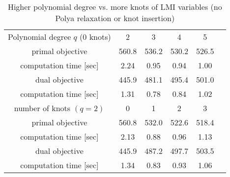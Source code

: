 \documentclass{article}
\begin{document}
\begin{table}
	\centering
	\caption{Higher polynomial degree vs. more knots of LMI variables (no Polya relaxation or knot insertion)} \vspace{0.2cm}
	\label{tab:incdeg_knot}
	\begin{tabular}{cccccc}
		\toprule
	  Polynomial degree $q$ (0 knots) & 2     & 3     & 4     & 5     \\
	  primal objective                & 560.8 & 536.2 & 530.2 & 526.5 \\
	  computation time [sec]  	      & 2.24  & 0.95  & 0.94  & 1.00  \\
	  dual objective          	      & 445.9 & 481.1 & 495.4 & 501.0 \\
	  computation time [sec]  	      & 1.31  & 0.78  & 0.84  & 1.02  \\
	  \midrule
	  number of knots $(q = 2)$       & 0     & 1     & 2     & 3     \\
	  primal objective                & 560.8 & 532.0 & 522.6 & 518.4 \\
	  computation time [sec]          & 2.13  & 0.88  & 0.96  & 1.13  \\
	  dual objective                  & 445.9 & 487.2 & 497.7 & 503.5 \\
	  computation time [sec]          & 1.34  & 0.83  & 0.93  & 1.06  \\
		\bottomrule
	\end{tabular}
\end{table}





\end{document}
